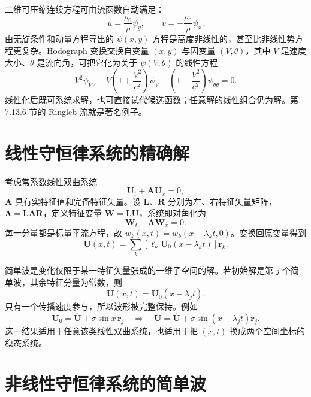 \documentclass[11pt,a4paper,openany,fontset=none]{ctexbook}
\begin{document}
二维可压缩连续方程可由流函数自动满足：
\begin{equation}
 u=\frac{\rho_0}{\rho}\psi_y,\qquad
 v=-\frac{\rho_0}{\rho}\psi_x. \tag{6.4.40--6.4.41}
\end{equation}
由无旋条件和动量方程导出的 $\psi(x,y)$ 方程是高度非线性的，甚至比非线性势方程更复杂。Hodograph 变换交换自变量 $(x,y)$ 与因变量 $(V,\theta)$，其中 $V$ 是速度大小、$\theta$ 是流向角，可把它化为关于 $\psi(V,\theta)$ 的线性方程
\begin{equation}
 V^2\psi_{VV}+V\left(1+\frac{V^2}{c^2}\right)\psi_V+
 \left(1-\frac{V^2}{c^2}\right)\psi_{\theta\theta}=0. \tag{6.4.45}
\end{equation}
线性化后既可系统求解，也可直接试代候选函数；任意解的线性组合仍为解。第 7.13.6 节的 Ringleb 流就是著名例子。

\section{线性守恒律系统的精确解}

考虑常系数线性双曲系统
\begin{equation}
 \bm U_t+\bm A\bm U_x=0, \tag{6.5.1}
\end{equation}
$\bm A$ 具有实特征值和完备特征矢量。设 $\bm L$、$\bm R$ 分别为左、右特征矢量矩阵，$\bm\Lambda=\bm L\bm A\bm R$，定义特征变量 $\bm W=\bm L\bm U$，系统即对角化为
\begin{equation}
 \bm W_t+\bm\Lambda\bm W_x=0. \tag{6.5.6}
\end{equation}
每一分量都是标量平流方程，故 $w_k(x,t)=w_k(x-\lambda_kt,0)$。变换回原变量得到
\begin{equation}
 \bm U(x,t)=\sum_k[\bm\ell_k\bm U_0(x-\lambda_kt)]\bm r_k. \tag{6.5.10}
\end{equation}

简单波是变化仅限于某一特征矢量张成的一维子空间的解。若初始解是第 $j$ 个简单波，其余特征分量为常数，则
\begin{equation}
 \bm U(x,t)=\bm U_0(x-\lambda_jt). \tag{6.5.12}
\end{equation}
只有一个传播速度参与，所以波形被完整保持。例如
\begin{equation}
 \bm U_0=\overline{\bm U}+\sigma\sin x\,\bm r_j
 \quad\Longrightarrow\quad
 \bm U=\overline{\bm U}+\sigma\sin(x-\lambda_jt)\bm r_j. \tag{6.5.13--6.5.14}
\end{equation}
这一结果适用于任意该类线性双曲系统，也适用于把 $(x,t)$ 换成两个空间坐标的稳态系统。

\section{非线性守恒律系统的简单波}
\end{document}
